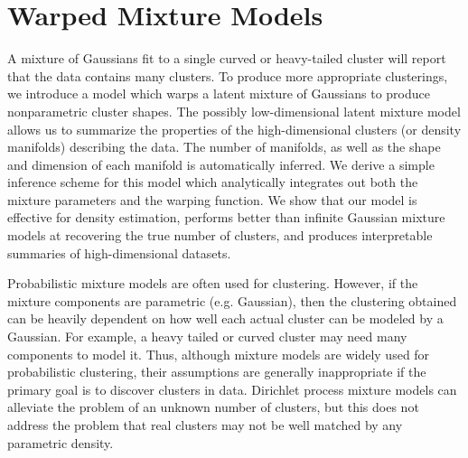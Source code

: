 
\inbpdocument

\chapter{Warped Mixture Models}  %
\label{ch:warped}


A mixture of Gaussians fit to a single curved or heavy-tailed cluster will report that the data contains many clusters.  
To produce more appropriate clusterings, we introduce a model which warps a latent mixture of Gaussians to produce nonparametric cluster shapes.  
The possibly low-dimensional latent mixture model allows us to summarize the properties of the high-dimensional clusters (or density manifolds) describing the data.  
The number of manifolds, as well as the shape and dimension of each manifold is automatically inferred.
We derive a simple inference scheme for this model which analytically integrates out both the mixture parameters and the warping function.  
We show that our model is effective for density estimation, performs better than infinite Gaussian mixture models at recovering the true number of clusters, and produces interpretable summaries of high-dimensional datasets.




Probabilistic mixture models are often used for clustering.
However, if the mixture components are parametric (e.g. Gaussian), then the clustering obtained can be heavily dependent on how well each actual cluster can be modeled by a Gaussian.
For example, a heavy tailed or curved cluster may need many components to model it.
Thus, although mixture models are widely used for probabilistic clustering, their assumptions are generally inappropriate if the primary goal is to discover clusters in data.
Dirichlet process mixture models can alleviate the problem of an unknown number of clusters, but this does not address the problem that real clusters may not be well matched by any parametric density.

